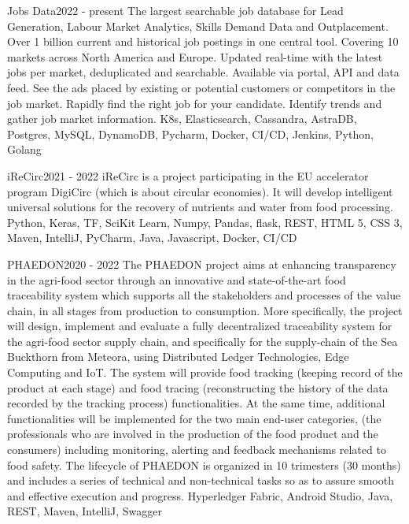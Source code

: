 
\begin{projects}
    \project
	{Jobs Data}{2022 - present}
	{}
	{The largest searchable job database for Lead Generation, Labour Market Analytics, Skills Demand Data and Outplacement. Over 1 billion current and historical job postings in one central tool. Covering 10 markets across North America and Europe. Updated real-time with the latest jobs per market, deduplicated and searchable. Available via portal, API and data feed. See the ads placed by existing or potential customers or competitors in the job market. Rapidly find the right job for your candidate. Identify trends and gather job market information.}
	{K8s, Elasticsearch, Cassandra, AstraDB, Postgres, MySQL, DynamoDB, Pycharm, Docker, CI/CD, Jenkins, Python, Golang}

    \project
	{iReCirc}{2021  - 2022}
	{}
	{iReCirc is a project participating in the EU accelerator program DigiCirc (which is about circular economies). It will develop intelligent universal solutions for the recovery of nutrients and water from food processing.}
	{Python, Keras, TF, SciKit Learn, Numpy, Pandas, flask, REST, HTML 5, CSS 3, Maven, IntelliJ, PyCharm, Java, Javascript, Docker, CI/CD}
 
	\project
	{PHAEDON}{2020 - 2022}
	{}
	{The PHAEDON project aims at enhancing transparency in the agri-food sector through an innovative and state-of-the-art food traceability system which supports all the stakeholders and processes of the value chain, in all stages from production to consumption. More specifically, the project will design, implement and evaluate a fully decentralized traceability system for the agri-food sector supply chain, and specifically for the supply-chain of the Sea Buckthorn from Meteora, using Distributed Ledger Technologies, Edge Computing and IoT. The system will provide food tracking (keeping record of the product at each stage) and food tracing (reconstructing the history of the data recorded by the tracking process) functionalities. At the same time, additional functionalities will be implemented for the two main end-user categories, (the professionals who are involved in the production of the food product and the consumers) including monitoring, alerting and feedback mechanisms related to food safety. The lifecycle of PHAEDON is organized in 10 trimesters (30 months) and includes a series of technical and non-technical tasks so as to assure smooth and effective execution and progress.}
	{Hyperledger Fabric, Android Studio, Java, REST, Maven, IntelliJ, Swagger}


\end{projects}
